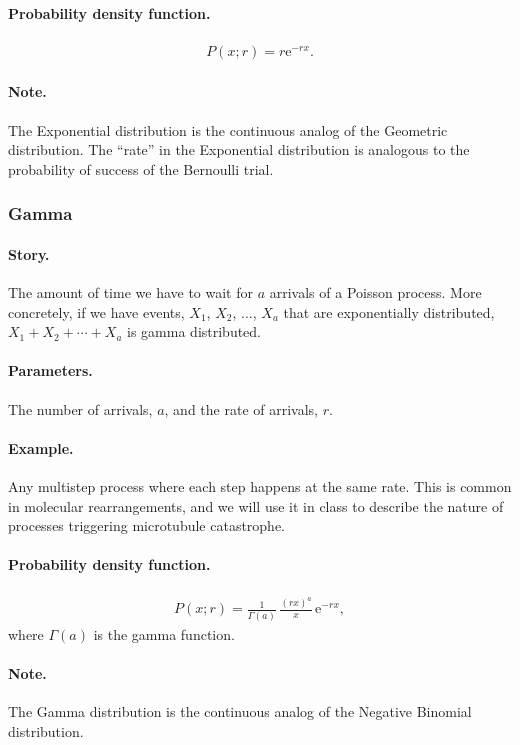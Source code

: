 \paragraph{Probability density function.}
\begin{align}
P(x;r) = r \mathrm{e}^{-rx}.
\end{align}
\paragraph{Note.} The Exponential distribution is the continuous
analog of the Geometric distribution.  The ``rate'' in the Exponential
distribution is analogous to the probability of success of the
Bernoulli trial.


\subsubsection{Gamma}
\paragraph{Story.} The amount of time we have to wait for $a$ arrivals
of a Poisson process.  More concretely, if we have events, $X_1$,
$X_2$, $\ldots$, $X_a$ that are exponentially distributed,
$X_1 + X_2 + \cdots + X_a$ is gamma distributed.
\paragraph{Parameters.} The number of arrivals, $a$, and the rate of
arrivals, $r$.
\paragraph{Example.} Any multistep process where each step happens at
the same rate.  This is common in molecular rearrangements, and we
will use it in class to describe the nature of processes triggering
microtubule catastrophe.
\paragraph{Probability density function.}
\begin{align}
P(x;r) = \frac{1}{\Gamma(a)}\,\frac{(rx)^a}{x}\,\mathrm{e}^{-rx},
\end{align}
where $\Gamma(a)$ is the gamma function.
\paragraph{Note.} The Gamma distribution is the continuous
analog of the Negative Binomial distribution.



